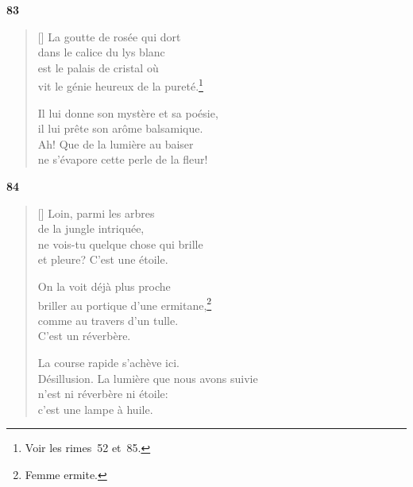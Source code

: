 \documentclass[a4paper,12pt]{book}
\begin{document}
\bigskip

\begin{center}
  \textbf{83}
\end{center}

\settowidth{\versewidth}{Il lui donne son mystère et sa poésie,}


\begin{verse}[\versewidth]
  La goutte de rosée qui dort \\
  dans le calice du lys blanc \\
  est le palais de cristal où \\
  vit le génie heureux de la pureté.\footnote{Voir les rimes~52 et~85.}

  Il lui donne son mystère et sa poésie, \\
  il lui prête son arôme balsamique. \\
  Ah! Que de la lumière au baiser \\
  ne s'évapore cette perle de la fleur!
\end{verse}

\bigskip

\begin{center}
  \textbf{84}
\end{center}

\settowidth{\versewidth}{Désillusion. La lumière que nous avons suivie}

\begin{verse}[\versewidth]
  Loin, parmi les arbres \\
  de la jungle intriquée, \\
  ne vois-tu quelque chose qui brille \\
  et pleure? C'est une étoile.

  On la voit déjà plus proche \\
  briller au portique d'une ermitane,\footnote{Femme ermite.} \\
  comme au travers d'un tulle. \\
  C'est un réverbère.

  La course rapide s'achève ici. \\
  Désillusion. La lumière que nous avons suivie \\
  n'est ni réverbère ni étoile: \\
  c'est une lampe à huile.
\end{verse}
\end{document}
